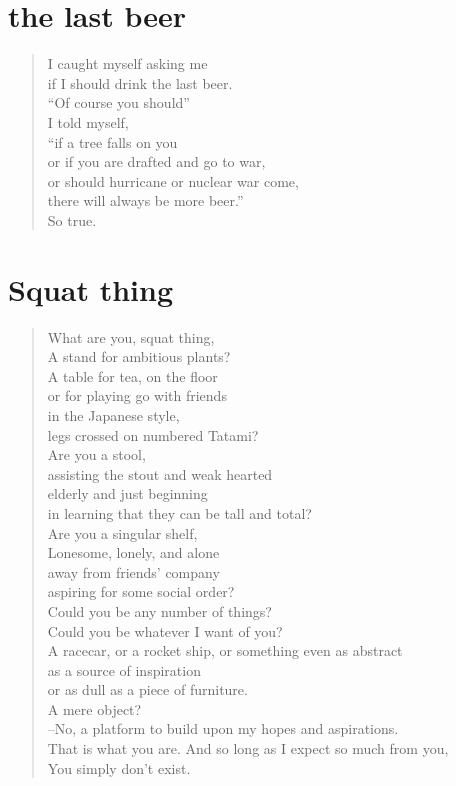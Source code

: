 \documentclass[times,12pt]{book}
\begin{document}
\section*{the last beer}
\begin{verse}
I caught myself asking me\\
if I should drink the last beer.\\

``Of course you should''\\
I told myself,\\
``if a tree falls on you\\
or if you are drafted and go to war,\\
or should hurricane or nuclear war come,\\
there will always be more beer.''\\[1in]

So true.
\end{verse}
\newpage

\section*{Squat thing}
\begin{verse}
What are you, squat thing,\\
A stand for ambitious plants?\\
A table for tea, on the floor\\
or for playing go with friends\\
in the Japanese style,\\
legs crossed on numbered Tatami?\\[12pt]

Are you a stool,\\
assisting the stout and weak hearted\\
elderly and just beginning\\
in learning that they can be tall and total?\\
Are you a singular shelf,\\
Lonesome, lonely, and alone\\
away from friends' company\\
aspiring for some social order?\\[12pt]

Could you be any number of things?\\
Could you be whatever I want of you?\\
A racecar, or a rocket ship, or something even as abstract\\
as a source of inspiration\\
or as dull as a piece of furniture.\\
A mere object?\\[12pt]

--No, a platform to build upon my hopes and aspirations.\\
That is what you are. And so long as I expect so much from you,\\
You simply don't exist.\\[12pt]
\end{verse}
\newpage
\end{document}
